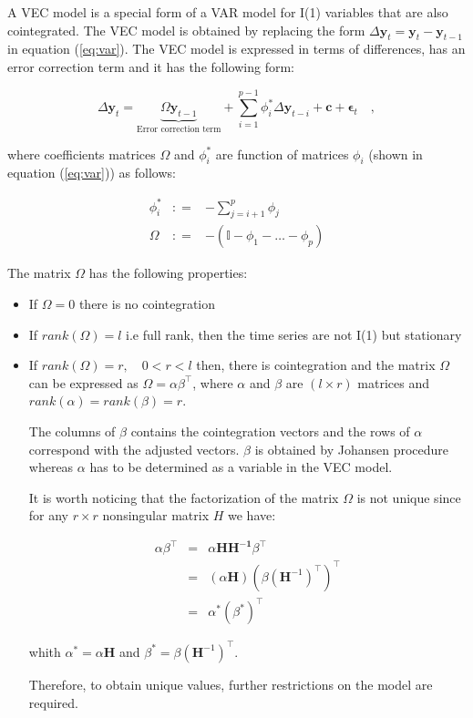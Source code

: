 A VEC model is a special form of a VAR model for I(1) variables that
are also cointegrated. The VEC model is obtained by replacing the form
$\Delta \mathbf{y}_t = \mathbf{y}_t - \mathbf{y}_{t-1}$ in equation
(\ref{eq:var}). The VEC model is expressed in terms of differences,
has an error correction term and it has the following form:

\begin{equation}
 \label{eq:vec}
 \Delta \mathbf{y}_t = 
 \underbrace{ \Omega\mathbf{y}_{t-1}}_\text{Error correction term} + 
 \sum_{i=1}^{p-1}
\phi_i^* \Delta \mathbf{y}_{t-i}  + \mathbf{c} + \mathbf{\epsilon}_t \quad ,
\end{equation}

\noindent where coefficients matrices $\Omega$ and $\phi_i^*$ are
function of matrices $\phi_i$ (shown in equation (\ref{eq:var})) as follows:

\begin{eqnarray*}
\phi_i^* &: =& -\sum_{j=i+1}^{p} \phi_j \\
\Omega &: =& -(\mathbb{I}-\phi_1-\dots-\phi_p) 
\end{eqnarray*}

The matrix $\Omega$ has the following properties:
\begin{itemize}
\item If $\Omega = 0$ there is no cointegration
\item If $rank(\Omega)=l$ i.e full rank, then the time series are not
I(1) but stationary
\item If $rank(\Omega)=r,\quad 0 < r < l$ then, there is cointegration
and the matrix $\Omega$ can be expressed as $\Omega =
\alpha \beta^\top$, where $\alpha$ and $\beta$ are $(l \times r)$
matrices and $rank(\alpha)=rank(\beta)=r$.

The columns of $\beta$ contains the cointegration vectors and the rows of
$\alpha$ correspond with the adjusted vectors. $\beta$ is obtained by Johansen
procedure~\cite{johansen1988} whereas $\alpha$ has to be determined as a
variable in the VEC model.

It is worth noticing that the factorization of the matrix $\Omega$ is not unique since for any
$r \times r$ nonsingular matrix $H$ we have:

\begin{eqnarray*}
\alpha \beta^\top &=& \alpha \mathbf{HH^{-1}} \beta^\top\\
&=&(\alpha\mathbf{H})(\beta(\mathbf{H}^{-1})^\top)^\top \\
&=& \alpha^*(\beta^*)^\top
\end{eqnarray*}

\noindent whith $\alpha^* = \alpha\mathbf{H}$ and $\beta^* =
\beta(\mathbf{H}^{-1})^\top$.

Therefore, to obtain unique values, further restrictions on the model
are required.

\end{itemize}

